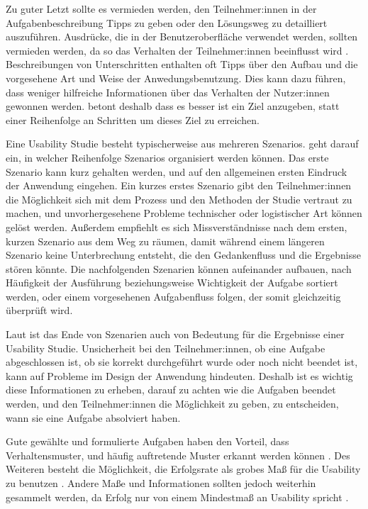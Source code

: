 Zu guter Letzt sollte es vermieden werden, den Teilnehmer:innen in der Aufgabenbeschreibung Tipps zu geben oder den Lösungsweg zu detailliert auszuführen. Ausdrücke, die in der Benutzeroberfläche verwendet werden, sollten vermieden werden, da so das Verhalten der Teilnehmer:innen beeinflusst wird \parencite{mccloskeyTaskScenarios2014, barnumUsabilityTesting2021}. Beschreibungen von Unterschritten enthalten oft Tipps über den Aufbau und die vorgesehene Art und Weise der Anwedungsbenutzung. Dies kann dazu führen, dass weniger hilfreiche Informationen über das Verhalten der Nutzer:innen gewonnen werden. \textcite{barnumUsabilityTesting2021} betont deshalb dass es besser ist ein Ziel anzugeben, statt einer Reihenfolge an Schritten um dieses Ziel zu erreichen.
\parencite{mccloskeyTaskScenarios2014}

Eine Usability Studie besteht typischerweise aus mehreren Szenarios. \textcite{barnumUsabilityTesting2021} geht darauf ein, in welcher Reihenfolge Szenarios organisiert werden können. Das erste Szenario kann kurz gehalten werden, und auf den allgemeinen ersten Eindruck der Anwendung eingehen. Ein kurzes erstes Szenario gibt den Teilnehmer:innen die Möglichkeit sich mit dem Prozess und den Methoden der Studie vertraut zu machen, und unvorhergesehene Probleme technischer oder logistischer Art können gelöst werden. Außerdem empfiehlt es sich Missverständnisse nach dem ersten, kurzen Szenario aus dem Weg zu räumen, damit während einem längeren Szenario keine Unterbrechung entsteht, die den Gedankenfluss und die Ergebnisse stören könnte. Die nachfolgenden Szenarien können aufeinander aufbauen, nach Häufigkeit der Ausführung beziehungsweise Wichtigkeit der Aufgabe sortiert werden, oder einem vorgesehenen Aufgabenfluss folgen, der somit gleichzeitig überprüft wird.
\parencite{barnumUsabilityTesting2021}

Laut \textcite{barnumUsabilityTesting2021} ist das Ende von Szenarien auch von Bedeutung für die Ergebnisse einer Usability Studie. Unsicherheit bei den Teilnehmer:innen, ob eine Aufgabe abgeschlossen ist, ob sie korrekt durchgeführt wurde oder noch nicht beendet ist, kann auf Probleme im Design der Anwendung hindeuten. Deshalb ist es wichtig diese Informationen zu erheben, darauf zu achten wie die Aufgaben beendet werden, und den Teilnehmer:innen die Möglichkeit zu geben, zu entscheiden, wann sie eine Aufgabe absolviert haben.
\parencite{barnumUsabilityTesting2021}

Gute gewählte und formulierte Aufgaben haben den Vorteil, dass Verhaltensmuster, und häufig auftretende Muster erkannt werden können \parencite{barnumUsabilityTesting2021}. Des Weiteren besteht die Möglichkeit, die Erfolgsrate als grobes Maß für die Usability zu benutzen \parencite{nielsenSuccessRate2001}. Andere Maße und Informationen sollten jedoch weiterhin gesammelt werden, da Erfolg nur von einem Mindestmaß an Usability spricht \parencite{nielsenSuccessRate2001}.
